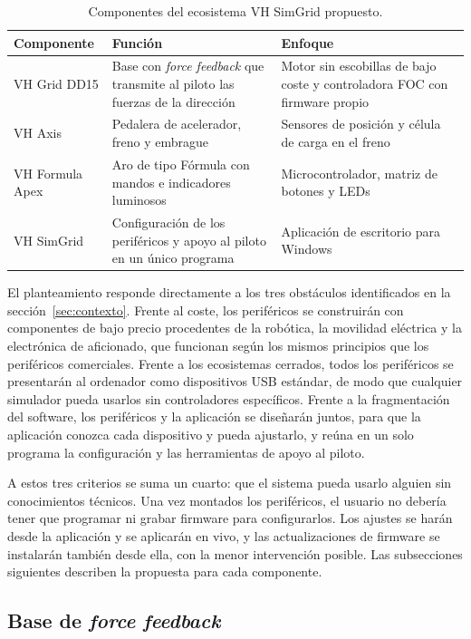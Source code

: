 \begin{table}[htbp]
	\centering
	\caption{Componentes del ecosistema VH SimGrid propuesto.}
	\label{tab:ecosistema}
	\small
	\begin{tabular}{|l|p{}|p{}|}
		\hline
		\textbf{Componente} & \textbf{Función} & \textbf{Enfoque} \\
		\hline
		VH Grid DD15 & Base con \textit{force feedback} que transmite al piloto las fuerzas de la dirección & Motor sin escobillas de bajo coste y controladora FOC con firmware propio \\
		\hline
		VH Axis & Pedalera de acelerador, freno y embrague & Sensores de posición y célula de carga en el freno \\
		\hline
		VH Formula Apex & Aro de tipo Fórmula con mandos e indicadores luminosos & Microcontrolador, matriz de botones y LEDs \\
		\hline
		VH SimGrid & Configuración de los periféricos y apoyo al piloto en un único programa & Aplicación de escritorio para Windows \\
		\hline
	\end{tabular}
\end{table}

El planteamiento responde directamente a los tres obstáculos identificados en la sección~\ref{sec:contexto}. Frente al coste, los periféricos se construirán con componentes de bajo precio procedentes de la robótica, la movilidad eléctrica y la electrónica de aficionado, que funcionan según los mismos principios que los periféricos comerciales. Frente a los ecosistemas cerrados, todos los periféricos se presentarán al ordenador como dispositivos USB estándar, de modo que cualquier simulador pueda usarlos sin controladores específicos. Frente a la fragmentación del software, los periféricos y la aplicación se diseñarán juntos, para que la aplicación conozca cada dispositivo y pueda ajustarlo, y reúna en un solo programa la configuración y las herramientas de apoyo al piloto.

A estos tres criterios se suma un cuarto: que el sistema pueda usarlo alguien sin conocimientos técnicos. Una vez montados los periféricos, el usuario no debería tener que programar ni grabar firmware para configurarlos. Los ajustes se harán desde la aplicación y se aplicarán en vivo, y las actualizaciones de firmware se instalarán también desde ella, con la menor intervención posible. Las subsecciones siguientes describen la propuesta para cada componente.

\subsection{Base de \textit{force feedback}}
\label{sec:propuesta-base}

